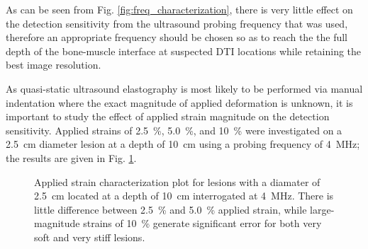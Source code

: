 			As can be seen from Fig. \ref{fig:freq_characterization}, there is very little effect on the detection sensitivity from the ultrasound probing frequency that was used, therefore an appropriate frequency should be chosen so as to reach the the full depth of the bone-muscle interface at suspected DTI locations while retaining the best image resolution.

			As quasi-static ultrasound elastography is most likely to be performed via manual indentation where the exact magnitude of applied deformation is unknown, it is important to study the effect of applied strain magnitude on the detection sensitivity. Applied strains of \SI{2.5}{\percent}, \SI{5.0}{\percent}, and \SI{10}{\percent} were investigated on a \SI{2.5}{\cm} diameter lesion at a depth of \SI{10}{\cm} using a probing frequency of \SI{4}{\MHz}; the results are given in Fig. \ref{fig:strain_characterization}.

			\begin{figure}[!htb]
				\centering
				\caption[Quasi-static applied strain characterization]{Applied strain characterization plot for lesions with a diamater of \SI{2.5}{\cm} located at a depth of \SI{10}{\cm} interrogated at \SI{4}{\MHz}. There is little difference between \SI{2.5}{\percent} and \SI{5.0}{\percent} applied strain, while large-magnitude strains of \SI{10}{\percent} generate significant error for both very soft and very stiff lesions.}
				\label{fig:strain_characterization}
			\end{figure}

